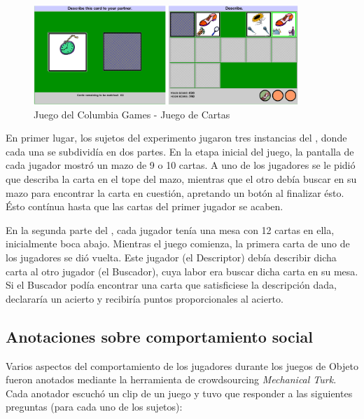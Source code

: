 \subsection{\cardgame}
\begin{figure}
\centering
\includegraphics[width=10cm]{images/columbia_games_card_game.png}
\caption{Juego del Columbia Games - Juego de Cartas}
\label{tablero_columbia_games}
\end{figure}


En primer lugar, los sujetos del experimento jugaron tres instancias del \cardgame, donde cada una se subdividía en dos partes. En la etapa inicial del juego, la pantalla de cada jugador mostró un mazo de 9 o 10 cartas. A uno de los jugadores se le pidió que describa la carta en el tope del mazo, mientras que el otro debía buscar en su mazo para encontrar la carta en cuestión, apretando un botón al finalizar ésto. Ésto contínua hasta que las cartas del primer jugador se acaben.


En la segunda parte del \cardgame, cada jugador tenía una mesa con 12 cartas en ella, inicialmente boca abajo. Mientras el juego comienza, la primera carta de uno de los jugadores se dió vuelta. Este jugador (el Descriptor) debía describir dicha carta al otro jugador (el Buscador), cuya labor era buscar dicha carta en su mesa. Si el Buscador podía encontrar una carta que satisficiese la descripción dada, declararía un acierto y recibiría puntos proporcionales al acierto.

\subsection{\objectgame}


\subsection{Anotaciones sobre comportamiento social}

Varios aspectos del comportamiento de los jugadores durante los juegos de Objeto fueron anotados mediante la herramienta de crowdsourcing \emph{Mechanical Turk}. Cada anotador escuchó un clip de un juego y tuvo que responder a las siguientes preguntas (para cada uno de los sujetos):

